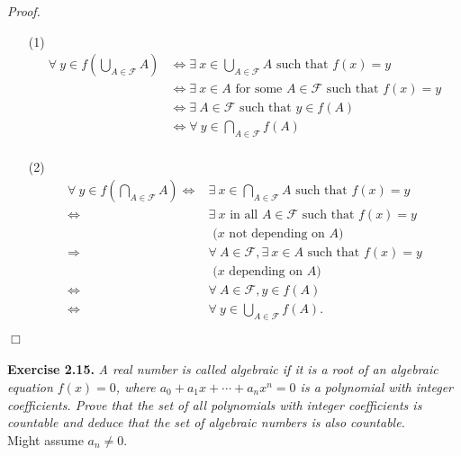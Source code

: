\documentclass{article}
\begin{document}
\emph{Proof.}
\begin{enumerate}
\item[(1)]
\begin{align*}
  \forall \: y \in f\left( \bigcup_{A \in \mathscr{F}} A \right)
  &\Longleftrightarrow
  \exists \: x \in \bigcup_{A \in \mathscr{F}} A \text{ such that } f(x) = y \\
  &\Longleftrightarrow
  \exists \: x \in A \text{ for some } A \in \mathscr{F} \text{ such that } f(x) = y \\
  &\Longleftrightarrow
  \exists \: A \in \mathscr{F} \text{ such that } y \in f(A) \\
  &\Longleftrightarrow
  \forall \: y \in \bigcap_{A \in \mathscr{F}} f(A) \\
\end{align*}
\item[(2)]
\begin{align*}
  \forall \: y \in f\left( \bigcap_{A \in \mathscr{F}} A \right)
  \Longleftrightarrow&
  \exists \: x \in \bigcap_{A \in \mathscr{F}} A \text{ such that } f(x) = y \\
  \Longleftrightarrow&
  \exists \: x \text{ in all } A \in \mathscr{F} \text{ such that } f(x) = y \\
  &\text{ ($x$ not depending on $A$) } \\
  \Longrightarrow&
  \forall \: A \in \mathscr{F}, \exists \: x \in A \text{ such that } f(x) = y \\
  &\text{ ($x$ depending on $A$) } \\
  \Longleftrightarrow&
  \forall \: A \in \mathscr{F}, y \in f(A) \\
  \Longleftrightarrow&
  \forall \: y \in \bigcup_{A \in \mathscr{F}} f(A).
\end{align*}
\end{enumerate}
$\Box$ \\\\



\textbf{Exercise 2.15.}
\emph{A real number is called algebraic
if it is a root of an algebraic equation $f(x) = 0$,
where $a_0 + a_1 x + \cdots + a_n x^n = 0$ is a polynomial with integer coefficients.
Prove that the set of all polynomials with integer coefficients is countable
and deduce that the set of algebraic numbers is also countable.} \\

Might assume $a_n \neq 0$. \\
\end{document}
